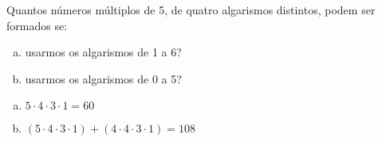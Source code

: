 \begin{ex}
 Quantos números múltiplos de 5, de quatro algarismos distintos, podem ser formados se:
    \begin{enumerate}[(a)]
    \item usarmos os algarismos de 1 a 6?
    \item usarmos os algarismos de 0 a 5?
    \end{enumerate}
     \begin{sol} 
          \phantom{A} 
       \begin{enumerate} [(a)]
           \item $5\cdot4\cdot3\cdot1=60$
       
       
          \item $(5\cdot4\cdot3\cdot1)+(4\cdot4\cdot3\cdot1)=108$
    
         
       \end{enumerate}
     \end{sol}
\end{ex}